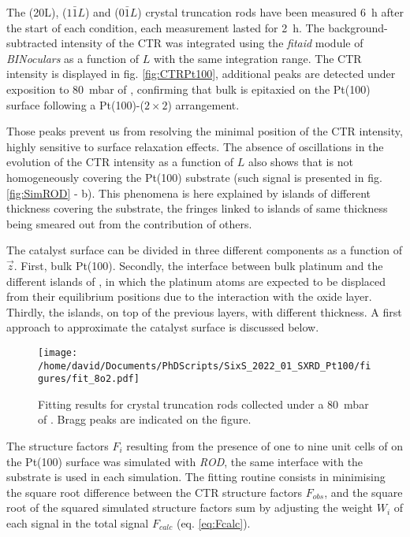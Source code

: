 The (20L), ($1\bar{1}L$) and (0$\bar{1}L$) crystal truncation rods have been measured \qty{6}{\hour} after the start of each condition, each measurement lasted for \qty{2}{\hour}.
The background-subtracted intensity of the CTR was integrated using the \textit{fitaid} module of \textit{BINoculars} as a function of $L$ with the same integration range.
The CTR intensity is displayed in fig. \ref{fig:CTRPt100}, additional peaks are detected under exposition to \qty{80}{\milli\bar} of , confirming that bulk  is epitaxied on the Pt(100) surface following a Pt(100)-($2\times2$) arrangement.

Those peaks prevent us from resolving the minimal position of the CTR intensity, highly sensitive to surface relaxation effects.
The absence of oscillations in the evolution of the CTR intensity as a function of $L$ also shows that  is not homogeneously covering the Pt(100) substrate (such signal is presented in fig. \ref{fig:SimROD} - b).
This phenomena is here explained by  islands of different thickness covering the substrate, the fringes linked to islands of same thickness being smeared out from the contribution of others.

The catalyst surface can be divided in three different components as a function of $\vec{z}$.
First, bulk Pt(100).
Secondly, the interface between bulk platinum and the different islands of , in which the platinum atoms are expected to be displaced from their equilibrium positions due to the interaction with the oxide layer.
Thirdly, the  islands, on top of the previous layers, with different thickness.
A first approach to approximate the catalyst surface is discussed below.

\begin{figure}[!htb]
    \centering
    \texttt{[image: /home/david/Documents/PhDScripts/SixS\_2022\_01\_SXRD\_Pt100/figures/fit\_8o2.pdf]}
    \caption{
        Fitting results for crystal truncation rods collected under a \qty{80}{\milli\bar} of .
         Bragg peaks are indicated on the figure.
    }
    \label{fig:CTRFitHighOxygen}
\end{figure}

The structure factors $F_i$ resulting from the presence of one to nine unit cells of  on the Pt(100) surface was simulated with \textit{ROD}, the same interface with the substrate is used in each simulation.
The fitting routine consists in minimising the square root difference between the CTR structure factors $F_{obs}$, and the square root of the squared simulated structure factors sum by adjusting the weight $W_i$ of each signal in the total signal $F_{calc}$ (eq. \ref{eq:Fcalc}).

